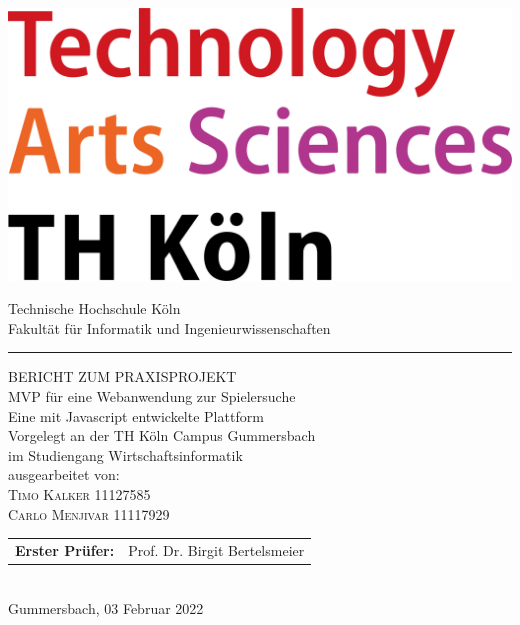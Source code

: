 \documentclass[a4paper,12pt,oneside]{article}
\begin{document}
\pagestyle{empty} %
\newpage %

\pagestyle{empty}
\begin{titlepage}
  \includegraphics[scale=0.20]{sources/TH_Koeln_Logo}\\
  \begin{center}
    \Large
    Technische Hochschule Köln\\
    Fakultät für Informatik und Ingenieurwissenschaften\\
    \hrule\par\rule{0pt}{2cm}
    \LARGE
    \textsc{BERICHT ZUM PRAXISPROJEKT}\\
    \vspace{0.8cm}
    \huge
    MVP für eine Webanwendung zur Spielersuche\\ 
    \Large
    Eine mit Javascript entwickelte Plattform \\
    \vspace{0.8cm}
    \large
    Vorgelegt an der TH Köln Campus Gummersbach\\
    im Studiengang Wirtschaftsinformatik\\
    \vspace{0.8cm}
    ausgearbeitet von:\\
    \textsc{Timo Kalker} 11127585\\
    \textsc{Carlo Menjivar} 11117929\\
    \vspace{1cm}
    \begin{tabular}{ll} %
      \textbf{Erster Prüfer:}  & Prof. Dr. Birgit Bertelsmeier \\
    \end{tabular}
    \vspace{0.5cm}
    \\Gummersbach, 03 Februar 2022
  \end{center}
\end{titlepage}
\end{document}
